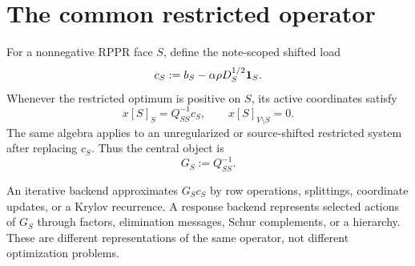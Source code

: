 \section{The common restricted operator}
\label{sec:operator}

For a nonnegative RPPR face $S$, define the note-scoped shifted load
\begin{equation}
 c_S:=b_S-\alpha\rho D_S^{1/2}\mathbf{1}_S.
 \label{eq:shifted-load}
\end{equation}
Whenever the restricted optimum is positive on $S$, its active coordinates
satisfy
\begin{equation}
 x[S]_S=Q_{SS}^{-1}c_S,
 \qquad
 x[S]_{V\setminus S}=0.
 \label{eq:restricted-state}
\end{equation}
The same algebra applies to an unregularized or source-shifted restricted
system after replacing $c_S$.  Thus the central object is
\begin{equation}
 G_S:=Q_{SS}^{-1}.
 \label{eq:green-operator}
\end{equation}

An iterative backend approximates $G_Sc_S$ by row operations, splittings,
coordinate updates, or a Krylov recurrence.  A response backend represents
selected actions of $G_S$ through factors, elimination messages, Schur
complements, or a hierarchy.  These are different representations of the same
operator, not different optimization problems.
